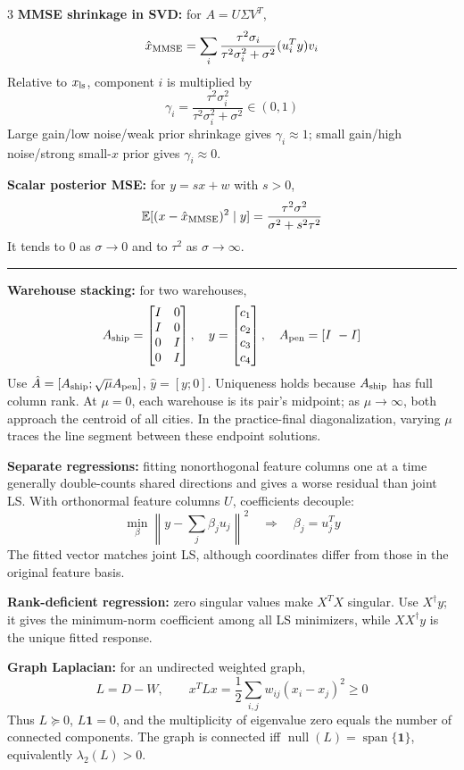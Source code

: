 \documentclass[10pt]{article}
\newcommand{\sect}[1]{\vspace{0.9pt}{\fontsize{7.2}{7.5}\selectfont\textbf{#1}}\vspace{0.25pt}\hrule\vspace{0.8pt}}
\newcommand{\sub}[1]{\textbf{#1}}
\newcommand{\nullsp}{\operatorname{null}}
\newcommand{\spn}{\operatorname{span}}
\newcommand{\E}{\mathbb{E}}
\newcommand{\one}{\mathbf{1}}
\begin{document}
\begin{multicols*}{3}
\sub{MMSE shrinkage in SVD:} for \(A=U\Sigma V^T\),
\[
\hat x_{\rm MMSE}
=\sum_i\frac{\tau^2\sigma_i}{\tau^2\sigma_i^2+\sigma^2}
(u_i^Ty)v_i
\]
Relative to \(x_{\rm ls}\), component \(i\) is multiplied by
\[
\gamma_i=\frac{\tau^2\sigma_i^2}
{\tau^2\sigma_i^2+\sigma^2}\in(0,1)
\]
Large gain/low noise/weak prior shrinkage gives \(\gamma_i\approx1\);
small gain/high noise/strong small-\(x\) prior gives \(\gamma_i\approx0\).

\sub{Scalar posterior MSE:} for \(y=sx+w\) with \(s>0\),
\[
\E[(x-\hat x_{\rm MMSE})^2\mid y]
=\frac{\tau^2\sigma^2}{\sigma^2+s^2\tau^2}
\]
It tends to \(0\) as \(\sigma\to0\) and to \(\tau^2\) as
\(\sigma\to\infty\).

\sect{Practice Final Problem Patterns}
\sub{Warehouse stacking:} for two warehouses,
\[
A_{\rm ship}=
\begin{bmatrix}I&0\\I&0\\0&I\\0&I\end{bmatrix},\quad
y=\begin{bmatrix}c_1\\c_2\\c_3\\c_4\end{bmatrix},\quad
A_{\rm pen}=[I\ -I]
\]
Use \(\hat A=[A_{\rm ship};\sqrt\mu A_{\rm pen}]\),
\(\hat y=[y;0]\). Uniqueness holds because \(A_{\rm ship}\) has full
column rank. At \(\mu=0\), each warehouse is its pair's midpoint; as
\(\mu\to\infty\), both approach the centroid of all cities. In the
practice-final diagonalization, varying \(\mu\) traces the line segment
between these endpoint solutions.

\sub{Separate regressions:} fitting nonorthogonal feature columns one at a
time generally double-counts shared directions and gives a worse residual
than joint LS. With orthonormal feature columns \(U\), coefficients decouple:
\[
\min_\beta\left\|y-\sum_j\beta_ju_j\right\|^2
\quad\Rightarrow\quad \beta_j=u_j^Ty
\]
The fitted vector matches joint LS, although coordinates differ from those
in the original feature basis.

\sub{Rank-deficient regression:} zero singular values make \(X^TX\)
singular. Use \(X^\dagger y\); it gives the minimum-norm coefficient among
all LS minimizers, while \(XX^\dagger y\) is the unique fitted response.

\sub{Graph Laplacian:} for an undirected weighted graph,
\[
L=D-W,\qquad
x^TLx=\frac12\sum_{i,j}w_{ij}(x_i-x_j)^2\ge0
\]
Thus \(L\succeq0\), \(L\one=0\), and the multiplicity of eigenvalue zero
equals the number of connected components. The graph is connected iff
\(\nullsp(L)=\spn\{\one\}\), equivalently \(\lambda_2(L)>0\).


\end{multicols*}
\end{document}
